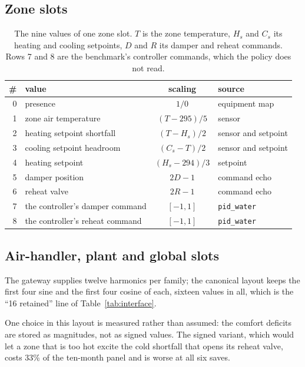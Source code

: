\documentclass{article}
\begin{document}
\subsection{Zone slots}
\label{app:zone}

\begin{table}[h!]
\centering
\small
\begin{tabular}{@{}rlcl@{}}
\toprule
\# & value & scaling & source \\
\midrule
0 & presence & $1/0$ & equipment map \\
1 & zone air temperature & $(T-295)/5$ & sensor \\
2 & heating setpoint shortfall & $(T-H_s)/2$ & sensor and setpoint \\
3 & cooling setpoint headroom & $(C_s-T)/2$ & sensor and setpoint \\
4 & heating setpoint & $(H_s-294)/3$ & setpoint \\
5 & damper position & $2D-1$ & command echo \\
6 & reheat valve & $2R-1$ & command echo \\
7 & the controller's damper command & $[-1,1]$ & \texttt{pid\_water} \\
8 & the controller's reheat command & $[-1,1]$ & \texttt{pid\_water} \\
\bottomrule
\end{tabular}
\vspace{4pt}
\caption{The nine values of one zone slot. $T$ is the zone temperature, $H_s$ and $C_s$ its heating and cooling setpoints, $D$ and $R$ its damper and reheat commands. Rows 7 and 8 are the benchmark's controller commands, which the policy does not read.}
\label{tab:app_zone_values}
\end{table}

\subsection{Air-handler, plant and global slots}
\label{app:ahu}

The gateway supplies twelve harmonics per family; the canonical layout keeps the first four sine and the first four cosine of each, sixteen values in all, which is the ``16 retained'' line of Table~\ref{tab:interface}.

One choice in this layout is measured rather than assumed: the comfort deficits are stored as magnitudes, not as signed values. The signed variant, which would let a zone that is too hot excite the cold shortfall that opens its reheat valve, costs 33\% of the ten-month panel and is worse at all six saves.
\end{document}
